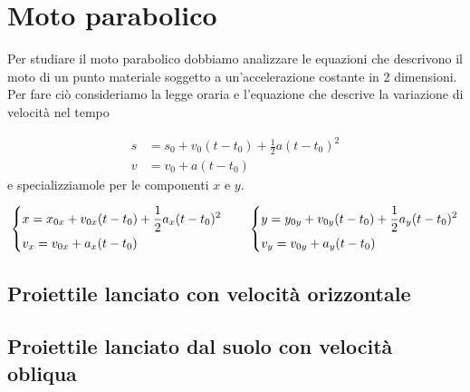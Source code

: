 \documentclass{article}
\begin{document}
\tableofcontents
\newpage

\section{Moto parabolico}
Per studiare il moto parabolico dobbiamo analizzare le equazioni che descrivono il moto di un punto materiale soggetto a un'accelerazione costante in 2 dimensioni.
Per fare ciò consideriamo la legge oraria e l'equazione che descrive la variazione di velocità nel tempo 

\begin{align}
  s &= s_0 + v_0 (t-t_0) + \frac{1}{2}a(t-t_0)^2 \\
  v &= v_0 + a(t-t_0)
\end{align}
e specializziamole per le componenti $x$ e $y$.

\begin{equation} \label{2dgeneric}
  \begin{dcases}
    x = x_{0x} + v_{0x} (t-t_0) + \frac{1}{2}a_x(t-t_0)^2 \\
    v_x = v_{0x} + a_x(t-t_0)
  \end{dcases}
  \qquad
  \begin{dcases}
    y = y_{0y} + v_{0y} (t-t_0) + \frac{1}{2}a_y(t-t_0)^2 \\
    v_y = v_{0y} + a_y(t-t_0)
  \end{dcases}
\end{equation}

\subsection{Proiettile lanciato con velocità orizzontale}

\subsection{Proiettile lanciato dal suolo con velocità obliqua}
\begin{center}
\end{center}
\end{document}

